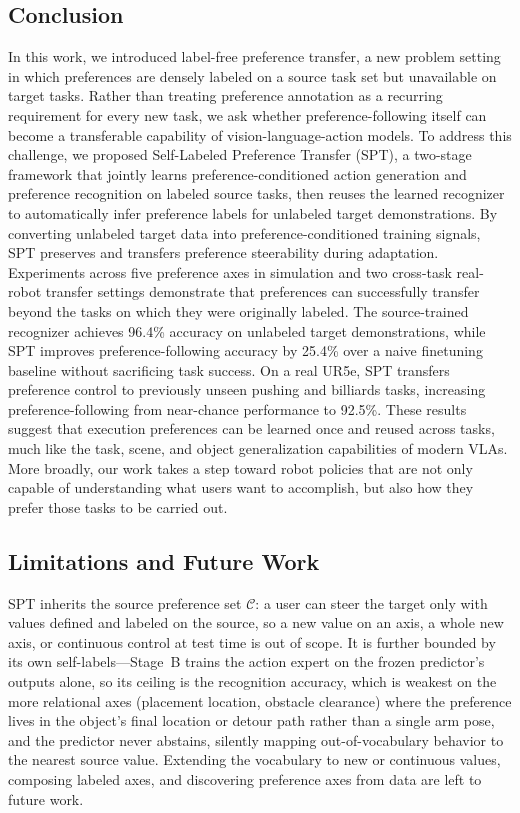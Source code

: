 \documentclass{article}
\begin{document}
\subsection{Conclusion}
\label{sec:conclusion}
In this work, we introduced label-free preference transfer, a new problem setting in which preferences are densely labeled on a source task set but unavailable on target tasks. Rather than treating preference annotation as a recurring requirement for every new task, we ask whether preference-following itself can become a transferable capability of vision-language-action models. To address this challenge, we proposed Self-Labeled Preference Transfer (SPT), a two-stage framework that jointly learns preference-conditioned action generation and preference recognition on labeled source tasks, then reuses the learned recognizer to automatically infer preference labels for unlabeled target demonstrations. By converting unlabeled target data into preference-conditioned training signals, SPT preserves and transfers preference steerability during adaptation. Experiments across five preference axes in simulation and two cross-task real-robot transfer settings demonstrate that preferences can successfully transfer beyond the tasks on which they were originally labeled. The source-trained recognizer achieves 96.4\% accuracy on unlabeled target demonstrations, while SPT improves preference-following accuracy by 25.4\% over a naive finetuning baseline without sacrificing task success. On a real UR5e, SPT transfers preference control to previously unseen pushing and billiards tasks, increasing preference-following from near-chance performance to 92.5\%. These results suggest that execution preferences can be learned once and reused across tasks, much like the task, scene, and object generalization capabilities of modern VLAs. More broadly, our work takes a step toward robot policies that are not only capable of understanding what users want to accomplish, but also how they prefer those tasks to be carried out.

\subsection{Limitations and Future Work}
\label{sec:limitations}

SPT inherits the source preference set $\mathcal{C}$: a user can steer the target only with values defined and labeled on the source, so a new value on an axis, a whole new axis, or continuous control at test time is out of scope. It is further bounded by its own self-labels---Stage~B trains the action expert on the frozen predictor's outputs alone, so its ceiling is the recognition accuracy, which is weakest on the more relational axes (placement location, obstacle clearance) where the preference lives in the object's final location or detour path rather than a single arm pose, and the predictor never abstains, silently mapping out-of-vocabulary behavior to the nearest source value. Extending the vocabulary to new or continuous values, composing labeled axes, and discovering preference axes from data are left to future work.
\end{document}
